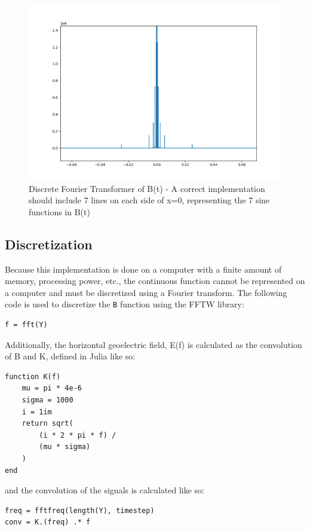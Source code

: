 \documentclass[letterpaper, 12 pt, conference]{ieeeconf}  %
\begin{document}
\begin{figure}
    \centering
    \includegraphics[width=\columnwidth]{Figure_2.png}
    \caption{Discrete Fourier Transformer of B(t) - A correct implementation should include 7 lines on each side of x=0, representing the 7 sine functions in B(t)}
    \label{fig:my_label}
\end{figure}



\subsection{Discretization}
\label{discretization}
Because this implementation is done on a computer with a finite amount of memory, processing power, etc., the continuous function cannot be represented on a computer and must be discretized using a Fourier transform. The following code is used to discretize the \verb|B| function using the FFTW library:
\begin{lstlisting}
f = fft(Y)
\end{lstlisting}

Additionally, the horizontal geoelectric field, E(f) is calculated as the convolution of B and K, defined in Julia like so:
    
\begin{lstlisting}
function K(f)
    mu = pi * 4e-6
    sigma = 1000
    i = 1im
    return sqrt(
        (i * 2 * pi * f) /
        (mu * sigma)
    )
end
\end{lstlisting}
    
and the convolution of the signals is calculated like so:
    
\begin{lstlisting}
freq = fftfreq(length(Y), timestep)
conv = K.(freq) .* f
\end{lstlisting}
\end{document}
